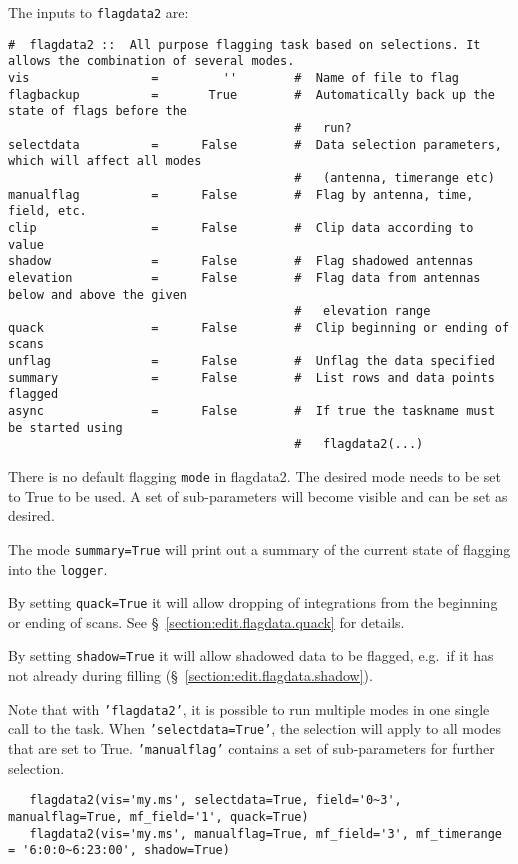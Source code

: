 The inputs to {\tt flagdata2} are:
\small
\begin{verbatim}
#  flagdata2 ::  All purpose flagging task based on selections. It allows the combination of several modes.
vis                 =         ''        #  Name of file to flag
flagbackup          =       True        #  Automatically back up the state of flags before the
                                        #   run?
selectdata          =      False        #  Data selection parameters, which will affect all modes
                                        #   (antenna, timerange etc)
manualflag          =      False        #  Flag by antenna, time, field, etc.
clip                =      False        #  Clip data according to value
shadow              =      False        #  Flag shadowed antennas
elevation           =      False        #  Flag data from antennas below and above the given
                                        #   elevation range
quack               =      False        #  Clip beginning or ending of scans
unflag              =      False        #  Unflag the data specified
summary             =      False        #  List rows and data points flagged
async               =      False        #  If true the taskname must be started using
                                        #   flagdata2(...)
\end{verbatim}
\normalsize

There is no default flagging {\tt mode} in flagdata2.  The desired mode needs to be set to True to be used. A set of sub-parameters will
become visible and can be set as desired.

The mode {\tt summary=True} will print out a summary of the current
state of flagging into the {\tt logger}.

By setting {\tt quack=True} it will allow dropping of integrations from the
beginning or ending of scans.  See \S~\ref{section:edit.flagdata.quack} for
details.

By setting {\tt shadow=True} it will allow shadowed data to be flagged,
e.g.\ if it has not already during filling 
(\S~\ref{section:edit.flagdata.shadow}).

Note that with {\tt 'flagdata2'}, it is possible to run multiple modes in one single call to the task. When {\tt 'selectdata=True'}, the
selection will apply to all modes that are set to True. {\tt 'manualflag'} contains a set of sub-parameters for further selection.
\small
\begin{verbatim}
   flagdata2(vis='my.ms', selectdata=True, field='0~3', manualflag=True, mf_field='1', quack=True)
   flagdata2(vis='my.ms', manualflag=True, mf_field='3', mf_timerange = '6:0:0~6:23:00', shadow=True)
\end{verbatim}
\normalsize


